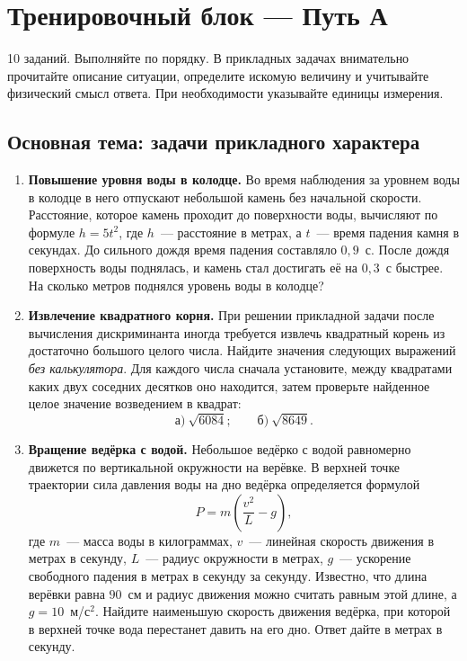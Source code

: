 \documentclass[a4paper,11pt]{article}
\newcommand{\keyword}[1]{\textcolor{darkaccent}{#1}}
\begin{document}
\section*{Тренировочный блок --- Путь А}
\begingroup\small
\noindent\keyword{10 заданий.} Выполняйте по порядку. В прикладных задачах внимательно прочитайте описание ситуации, определите искомую величину и учитывайте физический смысл ответа. При необходимости указывайте единицы измерения.

\subsection*{Основная тема: задачи прикладного характера}
\begin{enumerate}[label=\textbf{\arabic*.},leftmargin=1.0cm,itemsep=9pt]
\item \textbf{Повышение уровня воды в колодце.} Во время наблюдения за уровнем воды в колодце в него отпускают небольшой камень без начальной скорости. Расстояние, которое камень проходит до поверхности воды, вычисляют по формуле $h=5t^2$, где $h$~--- расстояние в метрах, а $t$~--- время падения камня в секундах. До сильного дождя время падения составляло $0{,}9$~с. После дождя поверхность воды поднялась, и камень стал достигать её на $0{,}3$~с быстрее. На сколько метров поднялся уровень воды в колодце?

\item \textbf{Извлечение квадратного корня.} При решении прикладной задачи после вычисления дискриминанта иногда требуется извлечь квадратный корень из достаточно большого целого числа. Найдите значения следующих выражений \emph{без калькулятора}. Для каждого числа сначала установите, между квадратами каких двух соседних десятков оно находится, затем проверьте найденное целое значение возведением в квадрат:
\[
\text{а)}\ \sqrt{6084};\qquad \text{б)}\ \sqrt{8649}.
\]

\item \textbf{Вращение ведёрка с водой.} Небольшое ведёрко с водой равномерно движется по вертикальной окружности на верёвке. В верхней точке траектории сила давления воды на дно ведёрка определяется формулой
\[
 P=m\left(\frac{v^2}{L}-g\right),
\]
где $m$~--- масса воды в килограммах, $v$~--- линейная скорость движения в метрах в секунду, $L$~--- радиус окружности в метрах, $g$~--- ускорение свободного падения в метрах в секунду за секунду. Известно, что длина верёвки равна $90$~см и радиус движения можно считать равным этой длине, а $g=10$~м/с$^2$. Найдите наименьшую скорость движения ведёрка, при которой в верхней точке вода перестанет давить на его дно. Ответ дайте в метрах в секунду.


\end{enumerate}
\end{document}
